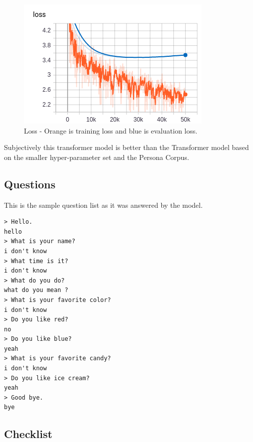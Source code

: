 \begin{figure}[H]
	\begin{center}
		\includegraphics[scale=3.5]{Figure_2}
		
		
	\end{center}
	\caption[Loss - Larger Transformer Model]{Loss - Orange is training loss and blue is evaluation loss.}
	
\end{figure}

Subjectively this transformer model is better than the Transformer model based on the smaller hyper-parameter set and the Persona Corpus.


\subsection{Questions}
This is the sample question list as it was answered by the model.

\begin{verbatim}
> Hello.
hello 
> What is your name?
i don't know 
> What time is it?
i don't know 
> What do you do?
what do you mean ?
> What is your favorite color?
i don't know 
> Do you like red?
no 
> Do you like blue?
yeah 
> What is your favorite candy?
i don't know 
> Do you like ice cream?
yeah 
> Good bye.
bye 
\end{verbatim}

\subsection{Checklist}

